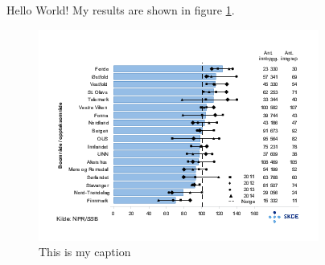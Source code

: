 \documentclass{article}
\begin{document}
Hello World!
My results are shown in figure \ref{fig:my_results}. 

\begin{figure}[h]
\includegraphics{fig.png}
\caption{This is my caption}\label{fig:my_results}
\end{figure}
\end{document}
